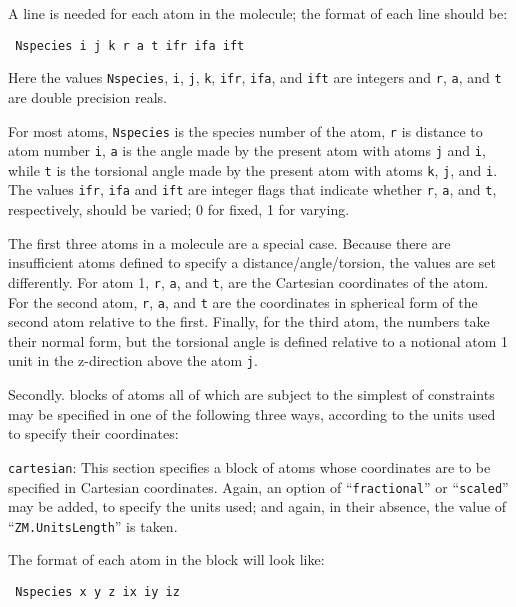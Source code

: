 \documentclass[11pt]{article}
\begin{document}
\begin{description}
A line is needed for each atom in the molecule; the format of each
line should be:

\noindent\texttt{    Nspecies i j k r a t ifr ifa ift}

Here the values \texttt{Nspecies}, \texttt{i}, \texttt{j}, \texttt{k},
\texttt{ifr}, \texttt{ifa}, and \texttt{ift} are integers and
\texttt{r}, \texttt{a}, and \texttt{t} are double precision reals.

For most atoms, \texttt{Nspecies} is the species number of the atom,
\texttt{r} is distance to atom number \texttt{i}, \texttt{a} is the
angle made by the present atom with atoms \texttt{j} and \texttt{i},
while \texttt{t} is the torsional angle made by the present atom with
atoms \texttt{k}, \texttt{j}, and \texttt{i}. The values \texttt{ifr},
\texttt{ifa} and \texttt{ift} are integer flags that indicate whether
\texttt{r}, \texttt{a}, and \texttt{t}, respectively, should be
varied; 0 for fixed, 1 for varying.


The first three atoms in a molecule are a special case. Because there
are insufficient atoms defined to specify a distance/angle/torsion,
the values are set differently. For atom 1, \texttt{r}, \texttt{a},
and \texttt{t}, are the Cartesian coordinates of the atom.  For the
second atom, \texttt{r}, \texttt{a}, and \texttt{t} are the
coordinates in spherical form of the second atom relative to the
first. Finally, for the third atom, the numbers take their normal
form, but the torsional angle is defined relative to a notional atom 1
unit in the z-direction above the atom \texttt{j}.

Secondly. blocks of atoms all of which are subject to the simplest of
constraints may be specified in one of the following three ways,
according to the units used to specify their coordinates:


\item \texttt{cartesian}: This section specifies a block of atoms
whose coordinates are to be specified in Cartesian coordinates. Again,
an option of ``\texttt{fractional}'' or ``\texttt{scaled}'' may be
added, to specify the units used; and again, in their absence, the
value of ``\texttt{ZM.UnitsLength}'' is taken.

The format of each atom in the block will look like:

\noindent\texttt{      Nspecies x y z ix iy iz}


\end{description}
\end{document}
